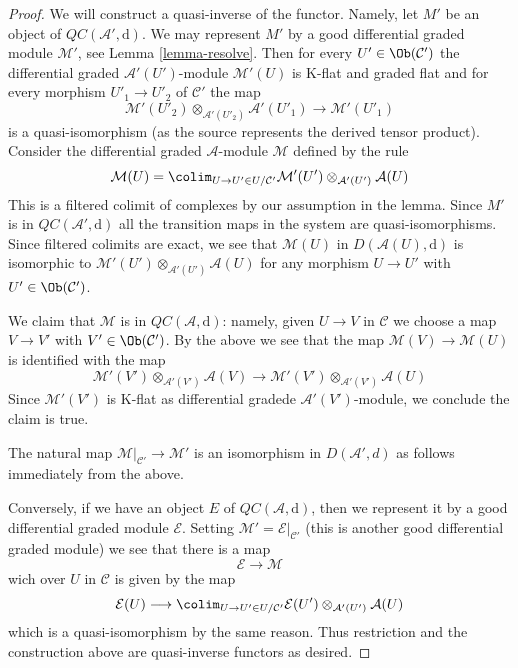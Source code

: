 \begin{proof}
We will construct a quasi-inverse of the functor. Namely,
let $M'$ be an object of $\mathit{QC}(\mathcal{A}', \text{d})$.
We may represent $M'$ by a good differential graded module $\mathcal{M}'$,
see Lemma \ref{lemma-resolve}. Then for every $U' \in \Ob(\mathcal{C}')$
the differential graded $\mathcal{A}'(U')$-module $\mathcal{M}'(U)$
is K-flat and graded flat and for every morphism $U'_1 \to U'_2$ of
$\mathcal{C}'$ the map
$$
\mathcal{M}'(U'_2) \otimes_{\mathcal{A}'(U'_2)} \mathcal{A}'(U'_1)
\longrightarrow
\mathcal{M}'(U'_1)
$$
is a quasi-isomorphism (as the source represents the derived tensor product).
Consider the differential graded
$\mathcal{A}$-module $\mathcal{M}$ defined by the rule
$$
\mathcal{M}(U) =
\colim_{U \to U' \in U/\mathcal{C}'}
\mathcal{M}'(U') \otimes_{\mathcal{A}'(U')} \mathcal{A}(U)
$$
This is a filtered colimit of complexes by our assumption in the lemma.
Since $M'$ is in $\mathit{QC}(\mathcal{A}', \text{d})$ all the
transition maps in the system are quasi-isomorphisms. Since filtered
colimits are exact, we see that
$\mathcal{M}(U)$ in $D(\mathcal{A}(U), \text{d})$
is isomorphic to $\mathcal{M}'(U') \otimes_{\mathcal{A}'(U')} \mathcal{A}(U)$
for any morphism $U \to U'$ with $U' \in \Ob(\mathcal{C}')$.

\medskip\noindent
We claim that $\mathcal{M}$ is in
$\mathit{QC}(\mathcal{A}, \text{d})$: namely, given $U \to V$ in
$\mathcal{C}$ we choose a map $V \to V'$ with $V' \in \Ob(\mathcal{C}')$.
By the above we see that the map $\mathcal{M}(V) \to \mathcal{M}(U)$
is identified with the map
$$
\mathcal{M}'(V') \otimes_{\mathcal{A}'(V')} \mathcal{A}(V)
\longrightarrow
\mathcal{M}'(V') \otimes_{\mathcal{A}'(V')} \mathcal{A}(U)
$$
Since $\mathcal{M'}(V')$ is K-flat as
differential gradede $\mathcal{A}'(V')$-module, we conclude
the claim is true.

\medskip\noindent
The natural map $\mathcal{M}|_{\mathcal{C}'} \to \mathcal{M}'$ is an
isomorphism in $D(\mathcal{A}', d)$ as follows immediately from the above.

\medskip\noindent
Conversely, if we have an object $E$ of $\mathit{QC}(\mathcal{A}, \text{d})$,
then we represent it by a good differential graded module $\mathcal{E}$.
Setting $\mathcal{M}' = \mathcal{E}|_{\mathcal{C}'}$ (this is another good
differential graded module) we see that there is a map
$$
\mathcal{E} \to \mathcal{M}
$$
wich over $U$ in $\mathcal{C}$ is given by the map
$$
\mathcal{E}(U)
\longrightarrow
\colim_{U \to U' \in U/\mathcal{C}'}
\mathcal{E}(U') \otimes_{\mathcal{A}'(U')} \mathcal{A}(U)
$$
which is a quasi-isomorphism by the same reason. Thus restriction and
the construction above are quasi-inverse functors as desired.
\end{proof}

